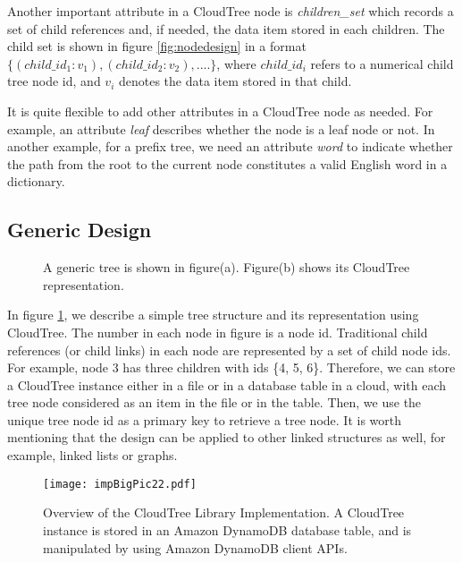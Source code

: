 \documentclass[10pt, conference, compsocconf]{IEEEtran}
\begin{document}
Another important attribute in a CloudTree node is \emph{children\_set} which records a set of 
child references and, if needed, the data item stored in each children. The child set is shown in figure \ref{fig:nodedesign} in a format 
$\{(child\_id_1 : v_1), (child\_id_2 : v_2), ....\}$, where $child\_id_i$ refers to a numerical child tree node id, and $v_i$ denotes the data item
stored in that child. 


It is quite flexible to add other attributes in a CloudTree node as needed.
For example, an attribute \emph{leaf} describes whether the node is a leaf node or not.
In another example, for a prefix tree, we need an attribute \emph{word} to 
indicate whether the path from the root to the current node constitutes a valid English word
in a dictionary.

\subsection{Generic Design}
 \begin{figure}[t]
\centering
{}
\hspace*{1cm}
 \caption[]{A generic tree is shown in figure(a). Figure(b) shows its CloudTree representation.
}
\label{fig:generic}
\end{figure}

In figure \ref{fig:generic}, we describe a simple tree structure and its representation using CloudTree.
The number in each node in figure  is a node id. 
Traditional child references (or child links) in each node are represented by a set of child node ids. 
For example, node $3$ has three children with ids \{4, 5, 6\}. 
Therefore, we can store a CloudTree instance either in a file or in a database table in a cloud,
with each tree node considered as an item in the file or in the table. Then,
we use the unique tree node id as a primary key to retrieve a tree node. 
It is worth mentioning that the design can be applied to other linked structures as well, for example, 
linked lists or graphs. 



\begin{figure}[t]
\begin{center}
\texttt{[image: impBigPic22.pdf]}
\caption{Overview of the CloudTree Library Implementation. A CloudTree instance is stored in 
an Amazon DynamoDB database table, and is manipulated by using Amazon DynamoDB client APIs. }
\label{fig:impPic}
\end{center}
\end{figure}
\end{document}
